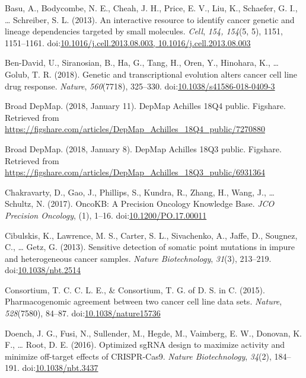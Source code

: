 \documentclass[man]{apa6}
\begin{document}
\hypertarget{ref-basu2013}{}
Basu, A., Bodycombe, N. E., Cheah, J. H., Price, E. V., Liu, K.,
Schaefer, G. I., \ldots{} Schreiber, S. L. (2013). An interactive
resource to identify cancer genetic and lineage dependencies targeted by
small molecules. \emph{Cell}, \emph{154, 154}(5, 5), 1151, 1151--1161.
doi:\href{https://doi.org/10.1016/j.cell.2013.08.003,\%2010.1016/j.cell.2013.08.003}{10.1016/j.cell.2013.08.003, 10.1016/j.cell.2013.08.003}

\hypertarget{ref-ben-david2018}{}
Ben-David, U., Siranosian, B., Ha, G., Tang, H., Oren, Y., Hinohara, K.,
\ldots{} Golub, T. R. (2018). Genetic and transcriptional evolution
alters cancer cell line drug response. \emph{Nature}, \emph{560}(7718),
325--330.
doi:\href{https://doi.org/10.1038/s41586-018-0409-3}{10.1038/s41586-018-0409-3}

\hypertarget{ref-broaddepmap2018a}{}
Broad DepMap. (2018, January 11). DepMap Achilles 18Q4 public. Figshare.
Retrieved from
\url{https://figshare.com/articles/DepMap_Achilles_18Q4_public/7270880}

\hypertarget{ref-broaddepmap2018}{}
Broad DepMap. (2018, January 8). DepMap Achilles 18Q3 public. Figshare.
Retrieved from
\url{https://figshare.com/articles/DepMap_Achilles_18Q3_public/6931364}

\hypertarget{ref-chakravarty2017}{}
Chakravarty, D., Gao, J., Phillips, S., Kundra, R., Zhang, H., Wang, J.,
\ldots{} Schultz, N. (2017). OncoKB: A Precision Oncology Knowledge
Base. \emph{JCO Precision Oncology}, (1), 1--16.
doi:\href{https://doi.org/10.1200/PO.17.00011}{10.1200/PO.17.00011}

\hypertarget{ref-cibulskis2013}{}
Cibulskis, K., Lawrence, M. S., Carter, S. L., Sivachenko, A., Jaffe,
D., Sougnez, C., \ldots{} Getz, G. (2013). Sensitive detection of
somatic point mutations in impure and heterogeneous cancer samples.
\emph{Nature Biotechnology}, \emph{31}(3), 213--219.
doi:\href{https://doi.org/10.1038/nbt.2514}{10.1038/nbt.2514}

\hypertarget{ref-consortium2015}{}
Consortium, T. C. C. L. E., \& Consortium, T. G. of D. S. in C. (2015).
Pharmacogenomic agreement between two cancer cell line data sets.
\emph{Nature}, \emph{528}(7580), 84--87.
doi:\href{https://doi.org/10.1038/nature15736}{10.1038/nature15736}

\hypertarget{ref-doench2016a}{}
Doench, J. G., Fusi, N., Sullender, M., Hegde, M., Vaimberg, E. W.,
Donovan, K. F., \ldots{} Root, D. E. (2016). Optimized sgRNA design to
maximize activity and minimize off-target effects of CRISPR-Cas9.
\emph{Nature Biotechnology}, \emph{34}(2), 184--191.
doi:\href{https://doi.org/10.1038/nbt.3437}{10.1038/nbt.3437}
\end{document}
